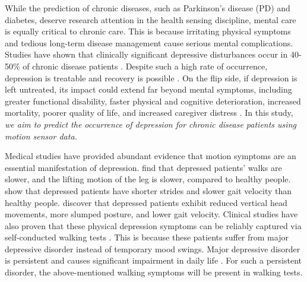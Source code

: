\documentclass[mnsc]{informs3b} %
\begin{document}
While the prediction of chronic diseases, such as Parkinson's disease (PD) and diabetes, deserve research attention in the health sensing discipline, mental care is equally critical to chronic care. This is because irritating physical symptoms and tedious long-term disease management cause serious mental complications. Studies have shown that clinically significant depressive disturbances occur in 40-50\% of chronic disease patients \citep{reijnders_systematic_2008}. Despite such a high rate of occurrence, depression is treatable and recovery is possible \citep{marsh_depression_2013}. On the flip side, if depression is left untreated, its impact could extend far beyond mental symptoms, including greater functional disability, faster physical and cognitive deterioration, increased mortality, poorer quality of life, and increased caregiver distress \citep{marsh_depression_2013}. In this study, \textit{we aim to predict the occurrence of depression for chronic disease patients using motion sensor data.}

Medical studies have provided abundant evidence that motion symptoms are an essential manifestation of depression. \cite{sloman_gait_1982} find that depressed patients' walks are slower, and the lifting motion of the leg is slower, compared to healthy people. \cite{lemke_spatiotemporal_2000} show that depressed patients have shorter strides and slower gait velocity than healthy people. \cite{michalak_embodiment_2009} discover that depressed patients exhibit reduced vertical head movements, more slumped posture, and lower gait velocity. Clinical studies have also proven that these physical depression symptoms can be reliably captured via self-conducted walking tests \citep{vancampfort_testretest_2020}. This is because these patients suffer from major depressive disorder instead of temporary mood swings. Major depressive disorder is persistent and causes significant impairment in daily life \citep{mayo_clinic_depression_2022}. For such a persistent disorder, the above-mentioned walking symptoms will be present in walking tests.
\end{document}
